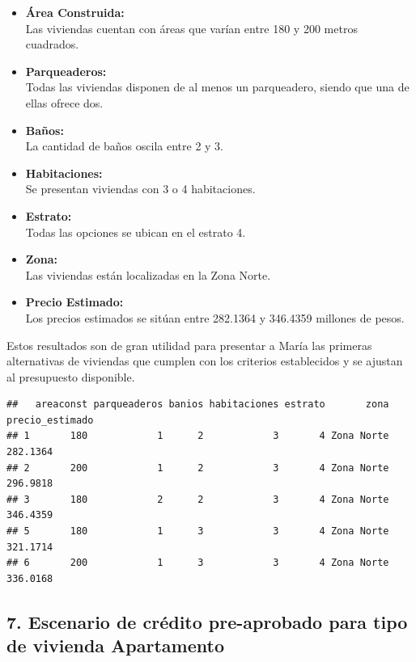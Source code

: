 \documentclass[
]{article}
\begin{document}
\begin{itemize}
\item
  \textbf{Área Construida:}\\
  Las viviendas cuentan con áreas que varían entre 180 y 200 metros
  cuadrados.
\item
  \textbf{Parqueaderos:}\\
  Todas las viviendas disponen de al menos un parqueadero, siendo que
  una de ellas ofrece dos.
\item
  \textbf{Baños:}\\
  La cantidad de baños oscila entre 2 y 3.
\item
  \textbf{Habitaciones:}\\
  Se presentan viviendas con 3 o 4 habitaciones.
\item
  \textbf{Estrato:}\\
  Todas las opciones se ubican en el estrato 4.
\item
  \textbf{Zona:}\\
  Las viviendas están localizadas en la Zona Norte.
\item
  \textbf{Precio Estimado:}\\
  Los precios estimados se sitúan entre 282.1364 y 346.4359 millones de
  pesos.
\end{itemize}

Estos resultados son de gran utilidad para presentar a María las
primeras alternativas de viviendas que cumplen con los criterios
establecidos y se ajustan al presupuesto disponible.

\begin{verbatim}
##   areaconst parqueaderos banios habitaciones estrato       zona precio_estimado
## 1       180            1      2            3       4 Zona Norte        282.1364
## 2       200            1      2            3       4 Zona Norte        296.9818
## 3       180            2      2            3       4 Zona Norte        346.4359
## 5       180            1      3            3       4 Zona Norte        321.1714
## 6       200            1      3            3       4 Zona Norte        336.0168
\end{verbatim}

\subsection{\texorpdfstring{\textbf{7. Escenario de crédito pre-aprobado
para tipo de vivienda
Apartamento}}{7. Escenario de crédito pre-aprobado para tipo de vivienda Apartamento}}\label{escenario-de-cruxe9dito-pre-aprobado-para-tipo-de-vivienda-apartamento}
\end{document}
